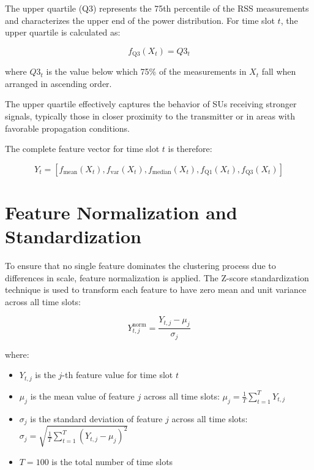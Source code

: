 The upper quartile (Q3) represents the 75th percentile of the RSS measurements and characterizes the upper end of the power distribution. For time slot $t$, the upper quartile is calculated as:

\begin{equation}
    f_{\text{Q3}}(X_t) = Q3_t
\end{equation}

where $Q3_t$ is the value below which 75\% of the measurements in $X_t$ fall when arranged in ascending order.

The upper quartile effectively captures the behavior of SUs receiving stronger signals, typically those in closer proximity to the transmitter or in areas with favorable propagation conditions.

The complete feature vector for time slot $t$ is therefore:

\begin{equation}
    Y_t = [f_{\text{mean}}(X_t), f_{\text{var}}(X_t), f_{\text{median}}(X_t), f_{\text{Q1}}(X_t), f_{\text{Q3}}(X_t)]
\end{equation}

\section{Feature Normalization and Standardization}

To ensure that no single feature dominates the clustering process due to differences in scale, feature normalization is applied. The Z-score standardization technique is used to transform each feature to have zero mean and unit variance across all time slots:

\begin{equation}
    Y_{t,j}^{\text{norm}} = \frac{Y_{t,j} - \mu_j}{\sigma_j}
\end{equation}

where:
\begin{itemize}
    \item $Y_{t,j}$ is the $j$-th feature value for time slot $t$
    \item $\mu_j$ is the mean value of feature $j$ across all time slots: $\mu_j = \frac{1}{T} \sum_{t=1}^{T} Y_{t,j}$
    \item $\sigma_j$ is the standard deviation of feature $j$ across all time slots: $\sigma_j = \sqrt{\frac{1}{T} \sum_{t=1}^{T} (Y_{t,j} - \mu_j)^2}$
    \item $T = 100$ is the total number of time slots
\end{itemize}

